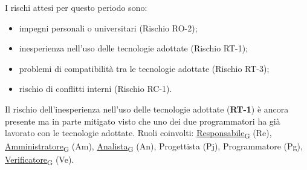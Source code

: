 I rischi attesi per questo periodo sono:
\begin{itemize}
	\item impegni personali o universitari (Rischio RO-2);
	\item inesperienza nell'uso delle tecnologie adottate (Rischio RT-1);
	\item problemi di compatibilità tra le tecnologie adottate (Rischio RT-3);
	\item rischio di conflitti interni (Rischio RC-1).
\end{itemize}
Il rischio dell'inesperienza nell'uso delle tecnologie adottate (\textbf{RT-1}) è ancora presente ma in parte mitigato visto che uno dei
due programmatori ha già lavorato con le tecnologie adottate.
\newpage
{}
Ruoli coinvolti: \href{https://7last.github.io/docs/rtb/documentazione-interna/glossario\#responsabile}{Responsabile\textsubscript{G}} (Re), \href{https://7last.github.io/docs/rtb/documentazione-interna/glossario\#amministratore}{Amministratore\textsubscript{G}} (Am), \href{https://7last.github.io/docs/rtb/documentazione-interna/glossario\#analista}{Analista\textsubscript{G}} (An), Progettista (Pj), Programmatore (Pg), \href{https://7last.github.io/docs/rtb/documentazione-interna/glossario\#verificatore}{Verificatore\textsubscript{G}} (Ve).

